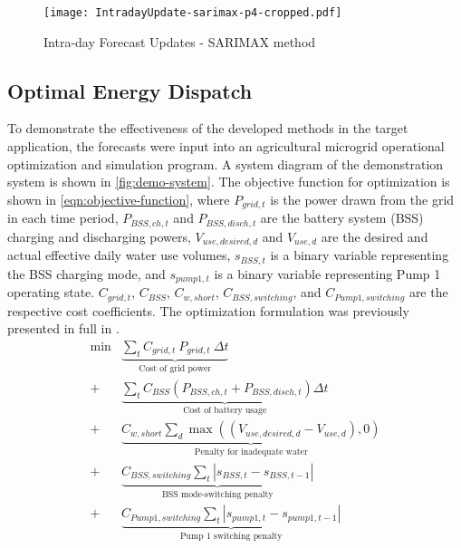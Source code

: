 \begin{figure}[tb]
	\centering
	\texttt{[image: IntradayUpdate-sarimax-p4-cropped.pdf]}
	\caption{Intra-day Forecast Updates - SARIMAX method}
	\label{fig:intraday-forecast}
\end{figure}


\subsection{Optimal Energy Dispatch}

To demonstrate the effectiveness of the developed methods in the target application,
the forecasts were input into an agricultural microgrid operational optimization and simulation program.
A system diagram of the demonstration system is shown in \cref{fig:demo-system}.
The objective function for optimization is shown in \cref{eqn:objective-function}, where
$P_{grid,t}$ is the power drawn from the grid in each time period,
$P_{BSS,ch,t}$ and $P_{BSS,disch,t}$ are the battery system (BSS) charging and discharging powers,
$V_{use,desired,d}$ and $V_{use,d}$ are the desired and actual effective daily water use volumes,
$s_{BSS,t}$ is a binary variable representing the BSS charging mode, and
$s_{pump1,t}$ is a binary variable representing Pump 1 operating state.
$C_{grid,t}$, $C_{BSS}$, $C_{w,short}$, $C_{BSS,switching}$, and $C_{Pump1,switching}$ are the respective cost coefficients.
The optimization formulation was previously presented in full in \cite{Brown2022}.
%
\begin{equation}
	\label{eqn:objective-function}
	\begin{split}
		\min &\underbrace{\sum_t C_{grid,t} \ P_{grid,t} \ \Delta t}_{\textrm{Cost of grid power}}
		\\
		{+} \: &\underbrace{\sum_t C_{BSS} \left( P_{BSS,ch,t} + P_{BSS,disch,t} \right) \Delta t}_{\textrm{Cost of battery usage}}
		\\
		{+} \: &\underbrace{C_{w,short} \sum_d \max\left(\left(V_{use,desired,d} - V_{use,d}\right), 0\right)}_{\textrm{Penalty for inadequate water}}
		\\
		{+} \: &\underbrace{C_{BSS,switching} \sum_t \left| s_{BSS,t} - s_{BSS,t-1} \right|}_{\textrm{BSS mode-switching penalty}}
		\\
		{+} \: &\underbrace{C_{Pump1,switching} \sum_t \left| s_{pump1,t} - s_{pump1,t-1} \right|}_{\textrm{Pump 1 switching penalty}}
	\end{split}
\end{equation}


